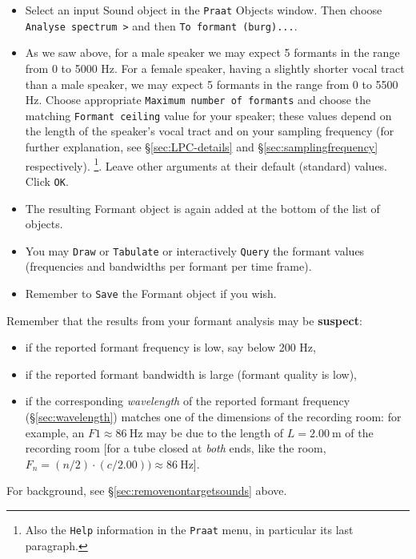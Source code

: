 \documentclass[
]{book}
\begin{document}
\begin{itemize}
\item
  Select an input Sound object in the \texttt{Praat} Objects window. Then choose \texttt{Analyse\ spectrum\ \textgreater{}} and then \texttt{To\ formant\ (burg)...}.
\item
  As we saw above, for a male speaker we may expect 5 formants in the range from 0 to 5000 Hz. For a female speaker, having a slightly shorter vocal tract than a male speaker, we may expect 5 formants in the range from 0 to 5500 Hz. Choose appropriate \texttt{Maximum\ number\ of\ formants} and choose the matching \texttt{Formant\ ceiling} value for your speaker; these values depend on the length of the speaker's vocal tract and on your sampling frequency (for further explanation, see §\ref{sec:LPC-details} and §\ref{sec:samplingfrequency} respectively).
  \footnote{Also the \texttt{Help} information in the \texttt{Praat} menu, in particular its last paragraph.}.
  Leave other arguments at their default (standard) values. Click \texttt{OK}.
\item
  The resulting Formant object is again added at the bottom of the list of objects.
\item
  You may \texttt{Draw} or \texttt{Tabulate} or interactively \texttt{Query} the formant values (frequencies and bandwidths per formant per time frame).
\item
  Remember to \texttt{Save} the Formant object if you wish.
\end{itemize}

\protect{}\label{box:formantanalysis}
Remember that the results from your formant analysis may be \textbf{suspect}:

\begin{itemize}
\item
  if the reported formant frequency is low, say below 200 Hz,
\item
  if the reported formant bandwidth is large (formant quality is low),
\item
  if the corresponding \emph{wavelength} of the reported formant frequency (§\ref{sec:wavelength}) matches one of the dimensions of the recording room: for example, an \(F1 \approx 86\ \textrm{Hz}\) may be due to the length of \(L=2.00\ \textrm{m}\) of the recording room {[}for a tube closed at \emph{both} ends, like the room, \(F_n=(n/2)\cdot(c/2.00)) \approx 86\ \textrm{Hz}\){]}.
\end{itemize}

For background, see §\ref{sec:removenontargetsounds} above.
\end{document}
